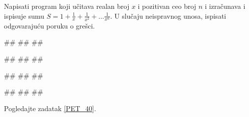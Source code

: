 \begin{Exercise}[label=PET_41]
Napisati program koji učitava realan broj $x$ i pozitivan ceo broj $n$ i 
izračunava i ispisuje sumu
$S=1+\frac{1}{x}+\frac{1}{x^2}+\ldots\frac{1}{x^n}$.
U slučaju neispravnog unosa, ispisati odgovarajuću poruku o grešci.

\begin{miditest}
\begin{upotreba}{1}
#\naslovInt#
##
##
\end{upotreba}
\end{miditest}
\begin{miditest}
\begin{upotreba}{2}
#\naslovInt#
##
##
\end{upotreba}
\end{miditest}

\begin{miditest}
\begin{upotreba}{3}
#\naslovInt#
##
##
\end{upotreba}
\end{miditest}
\begin{miditest}
\begin{upotreba}{4}
#\naslovInt#
##
##
\end{upotreba}
\end{miditest}

\end{Exercise}
\ifresenja
\begin{Answer}[ref=PET_41]

Pogledajte zadatak \ref{PET_40}.
\end{Answer}
\fi


